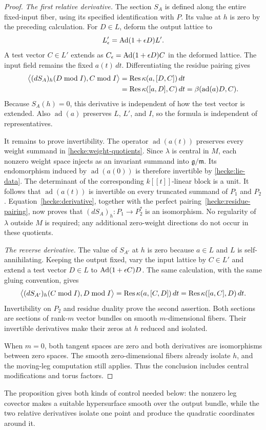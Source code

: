 \begin{proof}
\smallskip\noindent
\emph{The first relative derivative.}
The section $S_A$ is defined along the entire fixed-input fiber, using
its specified identification with $P$.  Its value at $h$ is zero by the
preceding calculation.  For $D\in L$, deform the output lattice to
\[
 L'_\epsilon=\operatorname{Ad}(1+\epsilon D)L'.
\]
A test vector $C\in L'$ extends as
$C_\epsilon=\operatorname{Ad}(1+\epsilon D)C$ in the deformed lattice.  The input
field remains the fixed $a(t)\,dt$.  Differentiating the residue
pairing gives
\begin{equation}\label{hecke:derivative}
 \begin{split}
 \big\langle(dS_A)_h(D\bmod I),C\bmod I\big\rangle
  &=\operatorname{Res}\kappa(a,[D,C])\,dt\\
  &=\operatorname{Res}\kappa([a,D],C)\,dt
   =\beta(\operatorname{ad}(a)D,C).
 \end{split}
\end{equation}
Because $S_A(h)=0$, this derivative is independent of how the test
vector is extended.  Also $\operatorname{ad}(a)$ preserves $L$, $L'$,
and $I$, so the formula is independent of representatives.

It remains to prove invertibility.  The operator
$\operatorname{ad}(a(t))$ preserves every weight summand in
\eqref{hecke:weight-quotients}.  Since $\lambda$ is central in $M$,
each nonzero weight space injects as an invariant summand into
$\mathfrak g/\mathfrak m$.  Its endomorphism induced by
$\operatorname{ad}(a(0))$ is therefore invertible by
\eqref{hecke:lie-data}.  The determinant of the corresponding
$k[[t]]$-linear block is a unit.  It follows that
$\operatorname{ad}(a(t))$ is invertible on every truncated summand of
$P_1$ and $P_2$.  Equation~\eqref{hecke:derivative}, together with the
perfect pairing~\eqref{hecke:residue-pairing}, now proves that
$(dS_A)_h:P_1\to P_2^*$ is an isomorphism.  No regularity of $\lambda$
outside $M$ is required; any additional zero-weight directions do not
occur in these quotients.

\smallskip\noindent
\emph{The reverse derivative.}
The value of $S_{A'}$ at $h$ is zero because $a\in L$ and $L$ is
self-annihilating.  Keeping the output fixed, vary the input lattice by
$C\in L'$ and extend a test vector $D\in L$ to
$\operatorname{Ad}(1+\epsilon C)D$.  The same calculation, with the same gluing
convention, gives
\[
 \big\langle(dS_{A'})_h(C\bmod I),D\bmod I\big\rangle
   =\operatorname{Res}\kappa(a,[C,D])\,dt
   =\operatorname{Res}\kappa([a,C],D)\,dt.
\]
Invertibility on $P_2$ and residue duality prove the second assertion.
Both sections are sections of rank-$m$ vector bundles on smooth
$m$-dimensional fibers.  Their invertible derivatives make their zeros
at $h$ reduced and isolated.

When $m=0$, both tangent spaces are zero and both derivatives are
isomorphisms between zero spaces.  The smooth zero-dimensional fibers
already isolate $h$, and the moving-leg computation still applies.
Thus the conclusion includes central modifications and torus factors.
\end{proof}

The proposition gives both kinds of control needed below: the nonzero
leg covector makes a suitable hypersurface smooth over the output
bundle, while the two relative derivatives isolate one point and produce
the quadratic coordinates around it.
